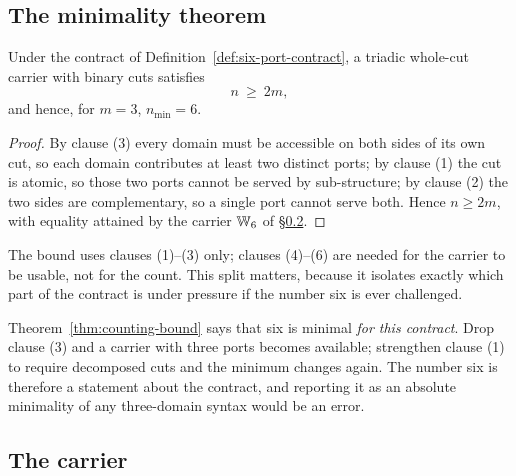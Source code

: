 \subsection{The minimality theorem}

\begin{theorem}\label{thm:counting-bound}
Under the contract of Definition~\ref{def:six-port-contract}, a triadic whole-cut carrier
with binary cuts satisfies
\[
  n\ \ge\ 2m ,
\]
and hence, for $m=3$, $n_{\min}=6$.
\end{theorem}

\begin{proof}
By clause (3) every domain must be accessible on both sides of its own cut, so each domain
contributes at least two distinct ports; by clause (1) the cut is atomic, so those two ports
cannot be served by sub-structure; by clause (2) the two sides are complementary, so a
single port cannot serve both.  Hence $n\ge 2m$, with equality attained by the carrier
$\mathbb{W}_6$ of \S\ref{sec:six-port-carrier}.
\end{proof}

\begin{remark}
The bound uses clauses (1)--(3) only; clauses (4)--(6) are needed for the carrier to be
usable, not for the count.  This split matters, because it isolates exactly which part of
the contract is under pressure if the number six is ever challenged.
\end{remark}

\begin{warning}\label{warn:six-conditional}
Theorem~\ref{thm:counting-bound} says that six is minimal \emph{for this contract}.  Drop
clause (3) and a carrier with three ports becomes available; strengthen clause (1) to
require decomposed cuts and the minimum changes again.  The number six is therefore a
statement about the contract, and reporting it as an absolute minimality of any
three-domain syntax would be an error.
\end{warning}

\subsection{The carrier}\label{sec:six-port-carrier}

